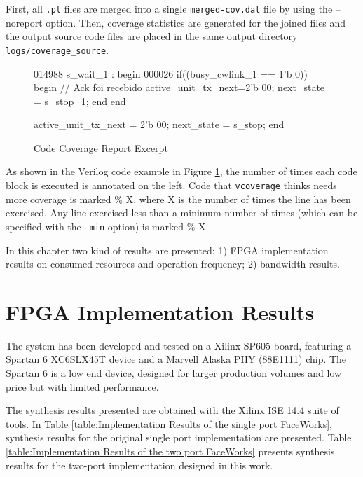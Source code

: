 \documentclass[defaultstyle,10pt,master,Helvetica]{thesis}
\begin{document}
First, all {\tt .pl} files are merged into a single {\tt merged-cov.dat} file by using the --noreport option. Then, coverage statistics are generated for the joined files and the output source code files are placed in the same output directory {\tt logs/coverage\_source}.

\begin{figure}[h]
\begin{boxedverbatim}
014988		s_wait_1 : begin
 000026		   if((busy_cwlink_1 == 1'b 0)) begin
		      // Ack foi recebido
		      active_unit_tx_next=2'b 00;
		      next_state = s_stop_1;
		   end
		end
	
	 	   active_unit_tx_next = 2'b 00;
		   next_state = s_stop;
		end
\end{boxedverbatim}
\caption{Code Coverage Report Excerpt}
\label{fig:cov_ex}
\end{figure}

As shown in the Verilog code example in Figure \ref{fig:cov_ex}, the number of times each code block is executed is annotated on the left. Code that {\tt vcoverage} thinks needs more coverage is marked \% X, where X is the number of times the line has been exercised. Any line exercised less than a minimum number of times (which can be specified with the {\tt --min} option) is marked \% X.

\cleardoublepage





In this chapter two kind of results are presented: 1) FPGA implementation results on consumed resources and operation frequency; 2) bandwidth results. 

\section{FPGA Implementation Results}

The system has been developed and tested on a Xilinx SP605 board, featuring a Spartan 6 XC6SLX45T device and a Marvell Alaska PHY (88E1111) chip. The Spartan 6 is a low end device, designed for larger production volumes and low price but with limited performance.

The synthesis results presented are obtained with the Xilinx ISE 14.4 suite of tools. In Table \ref{table:Implementation Results of the single port FaceWorks}, synthesis results for the original single port implementation are presented. Table \ref{table:Implementation Results of the two port FaceWorks} presents synthesis results for the two-port implementation designed in this work.
\end{document}

